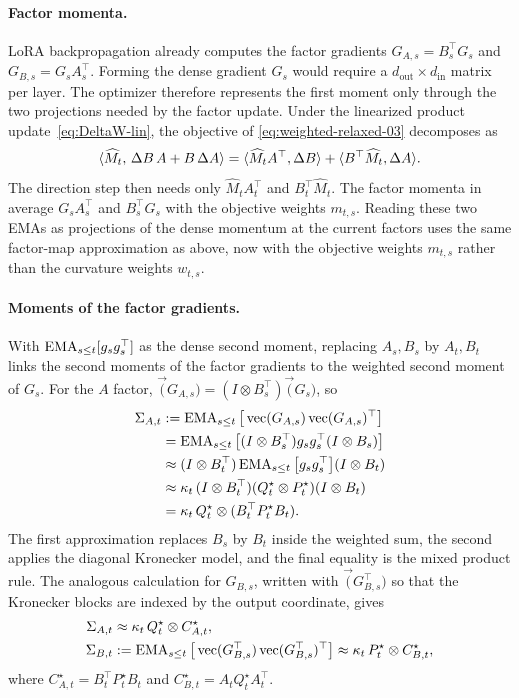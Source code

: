 \paragraph{Factor momenta.}
LoRA backpropagation already computes the factor gradients
$G_{A,s}=B_s^\top G_s$ and $G_{B,s}=G_sA_s^\top$. Forming the dense
gradient $G_s$ would require a $d_{\mathrm{out}}\times d_{\mathrm{in}}$
matrix per layer. The optimizer therefore represents the first moment only
through the two projections needed by the factor update. Under the
linearized product update~\eqref{eq:DeltaW-lin}, the objective of
\eqref{eq:weighted-relaxed-03} decomposes as
\[
  \langle \widehat M_t,\,\Delta B\,A+B\,\Delta A \rangle
  =
  \langle \widehat M_tA^\top,\Delta B \rangle
  +
  \langle B^\top\widehat M_t,\Delta A \rangle.
\]
The direction step then needs only $\widehat M_tA_t^\top$ and
$B_t^\top\widehat M_t$. The factor momenta in  average
$G_sA_s^\top$ and $B_s^\top G_s$ with the objective weights $m_{t,s}$.
Reading these two EMAs as projections of the dense momentum at the current
factors uses the same factor-map approximation as above, now with the objective
weights $m_{t,s}$ rather than the curvature weights $w_{t,s}$.

\paragraph{Moments of the factor gradients.}
With $\operatorname{EMA}_{s\le t}[g_sg_s^\top]$ as the dense second moment, replacing
$A_s,B_s$ by $A_t,B_t$ links the second moments of the factor gradients to
the weighted second moment of $G_s$. For the $A$ factor,
$\vec(G_{A,s})=(I\otimes B_s^\top)\vec(G_s)$, so
\begin{align*}
 \Sigma_{A,t}
 &:= \operatorname{EMA}_{s\le t}\big[\operatorname{vec}(G_{A,s})\operatorname{vec}(G_{A,s})^\top\big] \\
 &= \operatorname{EMA}_{s\le t}\big[
      (I\otimes B_s^\top)g_sg_s^\top(I\otimes B_s)
    \big] \\
 &\approx
    (I\otimes B_t^\top)
    \operatorname{EMA}_{s\le t}\big[g_sg_s^\top\big]
    (I\otimes B_t) \\
 &\approx
    \kappa_t\,(I\otimes B_t^\top)
    (Q^\star_t\otimes P^\star_t)
    (I\otimes B_t) \\
 &= \kappa_t\,Q^\star_t\otimes(B_t^\top P^\star_tB_t).
\end{align*}
The first approximation replaces $B_s$ by $B_t$ inside the weighted
sum, the second applies the diagonal Kronecker model, and the final
equality is the mixed product rule. The analogous calculation for
$G_{B,s}$, written with $\vec(G_{B,s}^\top)$ so that the Kronecker
blocks are indexed by the output coordinate, gives
\begin{align}
  \Sigma_{A,t}
    &\approx \kappa_t\,Q^\star_t\otimes C^\star_{A,t},
  \nonumber \\
  \Sigma_{B,t}
    &:= \operatorname{EMA}_{s\le t}\big[
      \operatorname{vec}(G_{B,s}^\top)\operatorname{vec}(G_{B,s}^\top)^\top
    \big]
    \approx \kappa_t\,P^\star_t\otimes C^\star_{B,t},
  \label{eq:observable-moments-03}
\end{align}
where
$C^\star_{A,t}=B_t^\top P^\star_tB_t$ and
$C^\star_{B,t}=A_tQ^\star_tA_t^\top$.

